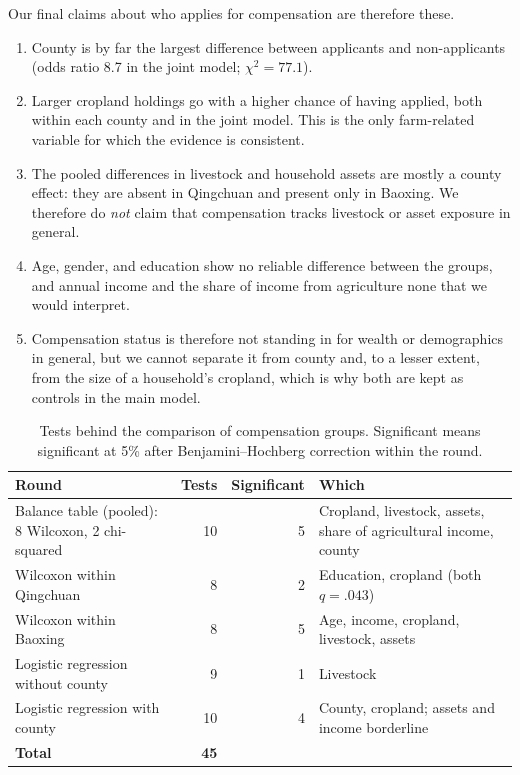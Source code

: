 Our final claims about who applies for compensation are therefore these.
\begin{enumerate}
  \item County is by far the largest difference between applicants and
    non-applicants (odds ratio 8.7 in the joint model; $\chi^2 = 77.1$).
  \item Larger cropland holdings go with a higher chance of having applied,
    both within each county and in the joint model. This is the only
    farm-related variable for which the evidence is consistent.
  \item The pooled differences in livestock and household assets are mostly
    a county effect: they are absent in Qingchuan and present only in Baoxing.
    We therefore do \emph{not} claim that compensation tracks livestock or
    asset exposure in general.
  \item Age, gender, and education show no reliable difference between the
    groups, and annual income and the share of income from agriculture none
    that we would interpret.
  \item Compensation status is therefore not standing in for wealth or
    demographics in general, but we cannot separate it from county and, to a
    lesser extent, from the size of a household's cropland, which is why both
    are kept as controls in the main model.
\end{enumerate}

\begin{table}[htbp]
\centering
\caption{Tests behind the comparison of compensation groups. Significant
means significant at 5\% after Benjamini--Hochberg correction within the
round.}
\label{tab:test-count}
\small
\begin{tabular}{p{4.8cm}rrp{4.4cm}}
\hline
\textbf{Round} & \textbf{Tests} & \textbf{Significant} & \textbf{Which} \\
\hline
Balance table (pooled): 8 Wilcoxon, 2 chi-squared & 10 & 5 & Cropland, livestock, assets, share of agricultural income, county \\
Wilcoxon within Qingchuan & 8 & 2 & Education, cropland (both $q = .043$) \\
Wilcoxon within Baoxing & 8 & 5 & Age, income, cropland, livestock, assets \\
Logistic regression without county & 9 & 1 & Livestock \\
Logistic regression with county & 10 & 4 & County, cropland; assets and income borderline \\
\hline
\textbf{Total} & \textbf{45} & & \\
\hline
\end{tabular}
\end{table}

